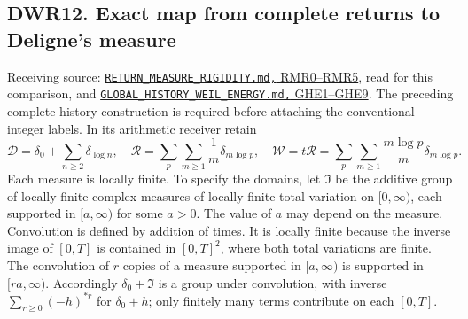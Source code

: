 \subsection{DWR12. Exact map from complete returns to Deligne's
measure}\label{dwr12.-exact-map-from-complete-returns-to-delignes-measure}

Receiving source:
\href{https://github.com/KokunoYumeto/zeta-function-research-reader/blob/96b02efaf4511d07f33de5ea4cfb10058e905d7e/workbenches/splitzero-tandem/continuations/20260924-cohomology-weight-and-character-lifts/geometric-positive-quotient/RETURN_MEASURE_RIGIDITY.md}{\nolinkurl{RETURN_MEASURE_RIGIDITY.md,}
RMR0--RMR5}, read for this comparison, and
\href{https://github.com/KokunoYumeto/zeta-function-research-reader/blob/96b02efaf4511d07f33de5ea4cfb10058e905d7e/workbenches/splitzero-tandem/continuations/20260924-cohomology-weight-and-character-lifts/geometric-positive-quotient/GLOBAL_HISTORY_WEIL_ENERGY.md}{\nolinkurl{GLOBAL_HISTORY_WEIL_ENERGY.md,}
GHE1--GHE9}. The preceding complete-history construction is required
before attaching the conventional integer labels. In its arithmetic
receiver retain \[
\mathcal D=\delta_0+\sum_{n\ge2}\delta_{\log n},\quad
\mathcal R=\sum_p\sum_{m\ge1}\frac1m\delta_{m\log p},\quad
\mathcal W=t\mathcal R=\sum_p\sum_{m\ge1}\frac{m\log p}{m}\delta_{m\log p}.
\tag{DWR12.1}
\] Each measure is locally finite. To specify the domains, let
\(\mathfrak I\) be the additive group of locally finite complex measures
of locally finite total variation on \([0,\infty)\), each supported in
\([a,\infty)\) for some \(a>0\). The value of \(a\) may depend on the
measure. Convolution is defined by addition of times. It is locally
finite because the inverse image of \([0,T]\) is contained in
\([0,T]^2\), where both total variations are finite. The convolution of
\(r\) copies of a measure supported in \([a,\infty)\) is supported in
\([ra,\infty)\). Accordingly \(\delta_0+\mathfrak I\) is a group under
convolution, with inverse \(\sum_{r\ge0}(-h)^{*r}\) for \(\delta_0+h\);
only finitely many terms contribute on each \([0,T]\).

